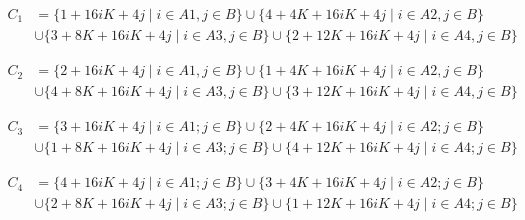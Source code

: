 \documentclass{amsc}          %
\numberwithin{equation}{section} %
\begin{document}
\begin{prof}
\begin{displaymath}
\begin{split}
C_{1} &=\{1+16iK+4j \mid i \in A1,j \in B\}\cup\{4+4K+16iK+4j \mid i\in A2,j \in B\}\\
&\cup\{3+8K+16iK+4j \mid i\in A3,j \in B\}\cup\{2+12K+16iK+4j \mid i\in A4,j \in B\}
\end{split}
\end{displaymath}

\begin{displaymath}
\begin{split}
C_{2} &=\{2+16iK+4j \mid i \in A1,j \in B\} \cup\{1+4K+16iK+4j \mid i \in A2,j \in B\} \\ 
&\cup\{4+8K+16iK+4j \mid i \in A3,j \in B\}  \cup\{3+12K+16iK+4j \mid i \in A4,j \in B\}
\end{split}
\end{displaymath}

\begin{displaymath}
\begin{split}
C_{3} &=\{3+16iK+4j \mid i \in A1;j \in B\}  \cup\{2+4K+16iK+4j \mid i \in A2; j \in B\} \\ 
&\cup\{1+8K+16iK+4j \mid i \in A3;j \in B\}  \cup\{4+12K+16iK+4j \mid i \in A4;j \in B\}
\end{split}
\end{displaymath}

\begin{displaymath}
\begin{split}
C_{4} &=\{4+16iK+4j \mid i \in A1;j \in B\}  \cup\{3+4K+16iK+4j \mid i \in A2;j \in B\} \\ 
&\cup\{2+8K+16iK+4j \mid i \in A3;j \in B\}  \cup\{1+12K+16iK+4j \mid i \in A4;j \in B\}
\end{split}
\end{displaymath}



\end{prof}
\end{document}
